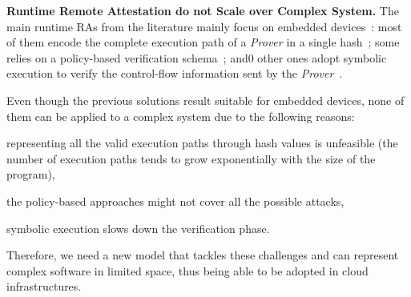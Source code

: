 \vspace{0.5cm}
\noindent \textbf{Runtime Remote Attestation do not Scale over Complex System.}
The main runtime RAs from the literature mainly focus on embedded 
devices~\citep{abera2016c,zeitouni2017atrium,aberadiat,dessouky2017fat,Dessouky:2018:LLH:3240765.3240821}:
most of them encode the complete execution path of a \emph{Prover} in a single 
hash~\citep{abera2016c,zeitouni2017atrium,dessouky2017fat}; 
some relies on a policy-based verification schema~\citep{aberadiat}; and0
other ones adopt symbolic execution to verify the control-flow information 
sent by the \emph{Prover}~\citep{Dessouky:2018:LLH:3240765.3240821}.

Even though the previous solutions result suitable for embedded devices, none 
of them can be applied to a complex system due to the following reasons: 
\begin{enumerate*}[label=(\roman*)]
	\item representing all the valid execution paths through hash values is 
	unfeasible (\eg the number of execution paths tends to grow exponentially 
	with the size of the program),
	\item the policy-based approaches might not cover all the possible attacks,
	\item symbolic execution slows down the verification phase.
\end{enumerate*}
Therefore, we need a new model that tackles these challenges and can represent 
complex software in limited space, thus being able to be adopted in cloud 
infrastructures. 

